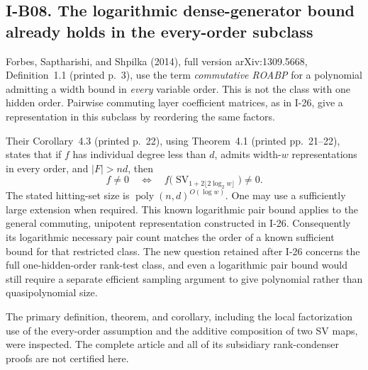 \subsection{I-B08. The logarithmic dense-generator bound already holds in the every-order subclass}
\label{I-B08}

Forbes, Saptharishi, and Shpilka (2014), full version
arXiv:1309.5668, Definition~1.1 (printed p.~3), use the term
\emph{commutative ROABP} for a polynomial admitting a width
bound in \emph{every} variable order.  This is not the class
with one hidden order.  Pairwise commuting layer coefficient
matrices, as in I-26, give a representation in this subclass
by reordering the same factors.

Their Corollary~4.3 (printed p.~22), using Theorem~4.1
(printed pp.~21--22), states that if $f$ has individual degree
less than $d$, admits width-$w$ representations in every order,
and $|F|>nd$, then
\[
 f\ne0\quad\Longleftrightarrow\quad
 f\bigl(\operatorname{SV}_{1+2\lfloor2\log_2w\rfloor}\bigr)
       \ne0.
\]
The stated hitting-set size is
$\operatorname{poly}(n,d)^{O(\log w)}$.
One may use a sufficiently large extension when required.
This known logarithmic pair bound applies to the general
commuting, unipotent representation constructed in I-26.
Consequently its logarithmic necessary pair count matches
the order of a known sufficient bound for that restricted
class.  The new question retained after I-26 concerns the
full one-hidden-order rank-test class, and even a logarithmic
pair bound would still require a separate efficient sampling
argument to give polynomial rather than quasipolynomial size.

The primary definition, theorem, and corollary, including
the local factorization use of the every-order assumption
and the additive composition of two SV maps, were inspected.
The complete article and all of its subsidiary rank-condenser
proofs are not certified here.
